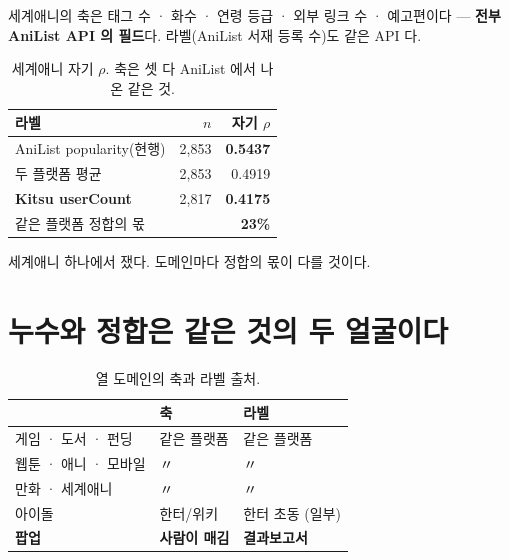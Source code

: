 \documentclass[10pt]{article}
\begin{document}
세계애니의 축은 태그 수 · 화수 · 연령 등급 · 외부 링크 수 · 예고편이다 ---
\textbf{전부 AniList API 의 필드}다. 라벨(AniList 서재 등록 수)도 같은 API 다.


\begin{table}[t]
\centering\tsize
\caption{세계애니 자기 $\rho$. 축은 셋 다 AniList 에서 나온 같은 것.}
\begin{tabular}{lrr}
\toprule
라벨 & $n$ & 자기 $\rho$ \\
\midrule
AniList popularity(현행) & 2,853 & \textbf{0.5437} \\
두 플랫폼 평균 & 2,853 & 0.4919 \\
\textbf{Kitsu userCount} & 2,817 & \textbf{0.4175} \\
\midrule
\multicolumn{2}{l}{같은 플랫폼 정합의 몫} & \textbf{23\%} \\
\bottomrule
\end{tabular}
\end{table}

{세계애니 하나에서 쟀다. 도메인마다 정합의 몫이 다를 것이다.}

\section{누수와 정합은 같은 것의 두 얼굴이다}

\begin{table}[t]
\centering\tsize
\caption{열 도메인의 축과 라벨 출처.}
\begin{tabular}{lll}
\toprule
& 축 & 라벨 \\
\midrule
게임 · 도서 · 펀딩 & 같은 플랫폼 & 같은 플랫폼 \\
웹툰 · 애니 · 모바일 & 〃 & 〃 \\
만화 · 세계애니 & 〃 & 〃 \\
\midrule
아이돌 & 한터/위키 & 한터 초동 \quad(일부) \\
\textbf{팝업} & \textbf{사람이 매김} & \textbf{결과보고서} \\
\bottomrule
\end{tabular}
\end{table}
\end{document}
